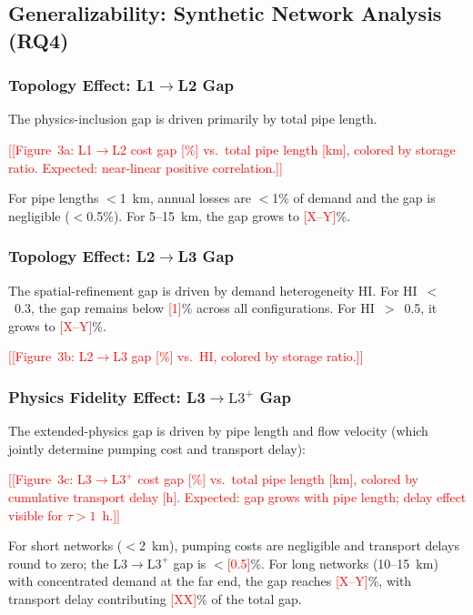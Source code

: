 \documentclass[review,3p]{elsarticle}
\newcommand{\placeholder}[1]{\textcolor{red}{[#1]}}
\newcommand{\Lplus}{\mathrm{L3}^{+}}
\begin{document}
\subsection{Generalizability: Synthetic Network Analysis (RQ4)}
\label{sec:results_generalizability}

\subsubsection{Topology Effect: L1$\to$L2 Gap}

The physics-inclusion gap is driven primarily by total pipe length.

\placeholder{[Figure~3a: L1$\to$L2 cost gap [\%] vs.\ total pipe
length [km], colored by storage ratio. Expected: near-linear
positive correlation.]}

For pipe lengths $<$1~km, annual losses are $<$1\% of demand and
the gap is negligible ($<$0.5\%). For 5--15~km, the gap grows to
\placeholder{X--Y}\%.

\subsubsection{Topology Effect: L2$\to$L3 Gap}

The spatial-refinement gap is driven by demand heterogeneity HI.
For HI~$<$~0.3, the gap remains below \placeholder{1}\% across
all configurations. For HI~$>$~0.5, it grows to
\placeholder{X--Y}\%.

\placeholder{[Figure~3b: L2$\to$L3 gap [\%] vs.\ HI, colored by
storage ratio.]}

\subsubsection{Physics Fidelity Effect: L3$\to\Lplus$ Gap}

The extended-physics gap is driven by pipe length and flow velocity
(which jointly determine pumping cost and transport delay):

\placeholder{[Figure~3c: L3$\to\Lplus$ cost gap [\%] vs.\ total
pipe length [km], colored by cumulative transport delay [h].
Expected: gap grows with pipe length; delay effect visible for
$\tau > 1$~h.]}

For short networks ($<$2~km), pumping costs are negligible and
transport delays round to zero; the L3$\to\Lplus$ gap is
$<$\placeholder{0.5}\%. For long networks (10--15~km) with
concentrated demand at the far end, the gap reaches
\placeholder{X--Y}\%, with transport delay contributing
\placeholder{XX}\% of the total gap.
\end{document}
